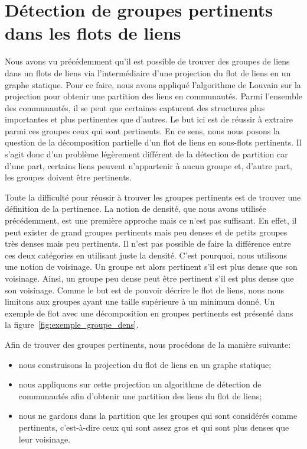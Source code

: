 \chapter{Détection de groupes pertinents dans les flots de liens}
\minitoc

\label{groupesDense}
Nous avons vu précédemment qu'il est possible de trouver des groupes de liens dans un flots de liens via l'intermédiaire d'une projection du flot de liens en un graphe statique.
Pour ce faire, nous avons appliqué l'algorithme de Louvain sur la projection pour obtenir une partition des liens en communautés.
Parmi l'ensemble des communautés, il se peut que certaines capturent des structures plus importantes et plus pertinentes que d'autres.
Le but ici est de réussir à extraire parmi ces groupes ceux qui sont pertinents.
En ce sens, nous nous posons la question de la décomposition partielle d'un flot de liens en sous-flots pertinents.
Il s'agit donc d'un problème légèrement différent de la détection de partition car d'une part, certains liens peuvent n'appartenir à aucun groupe et, d'autre part, les groupes doivent être pertinents.

Toute la difficulté pour réussir à trouver les groupes pertinents est de trouver une définition de la pertinence.
La notion de densité, que nous avons utilisée précédemment, est une première approche mais ce n'est pas suffisant.
En effet, il peut exister de grand groupes pertinents mais peu denses et de petits groupes très denses mais peu pertinents.
Il n'est pas possible de faire la différence entre ces deux catégories en utilisant juste la densité.
C'est pourquoi, nous utilisons une notion de voisinage.
Un groupe est alors pertinent s'il est plus dense que son voisinage.
Ainsi, un groupe peu dense peut être pertinent s'il est plus dense que son voisinage.
Comme le but est de pouvoir décrire le flot de liens, nous nous limitons aux groupes ayant une taille supérieure à un minimum donné.
Un exemple de flot avec une décomposition en groupes pertinents est présenté dans la figure~\ref{fig:exemple_groupe_dens}.

Afin de trouver des groupes pertinents, nous procédons de la manière suivante:
\begin{itemize}
\item nous construisons la projection du flot de liens en un graphe statique;
\item nous appliquons sur cette projection un algorithme de détection de communautés afin d'obtenir une partition des liens du flot de liens;
\item nous ne gardons dans la partition que les groupes qui sont considérés comme pertinents, c'est-à-dire ceux qui sont assez gros et qui sont plus denses que leur voisinage.
\end{itemize}

